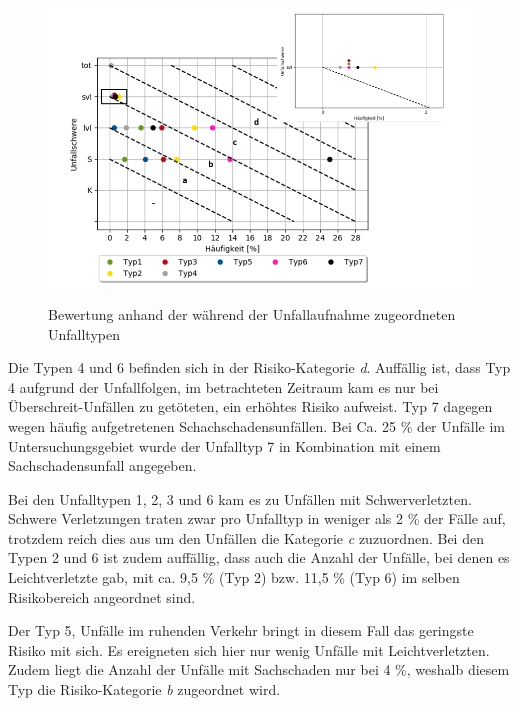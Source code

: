 \begin{savenotes}
	\begin{figure}[H]
		\centering
		\includegraphics[width=12cm,height=8cm]{figures/Bewertung_UT}
		\caption[Bewertung anhand der während der Unfallaufnahme zugeordneten Unfalltypen]{Bewertung anhand der während der Unfallaufnahme zugeordneten Unfalltypen}\label{fig:Bewertung_UT}
	\end{figure}
\end{savenotes}

Die Typen 4 und 6 befinden sich in der Risiko-Kategorie \textit{d}. Auffällig ist, dass Typ 4 aufgrund der Unfallfolgen, im  betrachteten Zeitraum kam es nur bei Überschreit-Unfällen zu getöteten, ein erhöhtes Risiko aufweist. Typ 7 dagegen wegen häufig aufgetretenen Schachschadensunfällen. Bei Ca. 25 \% der Unfälle im Untersuchungsgebiet wurde der Unfalltyp 7 in Kombination mit einem Sachschadensunfall angegeben.

Bei den Unfalltypen 1, 2, 3 und 6 kam es zu Unfällen mit Schwerverletzten. Schwere Verletzungen traten zwar pro Unfalltyp in weniger als 2 \% der Fälle auf, trotzdem reich dies aus um den Unfällen die Kategorie \textit{c} zuzuordnen. Bei den Typen 2 und 6 ist zudem auffällig, dass auch die Anzahl der Unfälle, bei denen es Leichtverletzte gab, mit ca. 9,5 \% (Typ 2) bzw. 11,5 \% (Typ 6) im selben Risikobereich angeordnet sind.

Der Typ 5, Unfälle im ruhenden Verkehr bringt in diesem Fall das geringste Risiko mit sich. Es ereigneten sich hier nur wenig Unfälle mit Leichtverletzten. Zudem liegt die Anzahl der Unfälle mit Sachschaden nur bei 4 \%, weshalb diesem Typ die Risiko-Kategorie
 \textit{b} zugeordnet wird.


